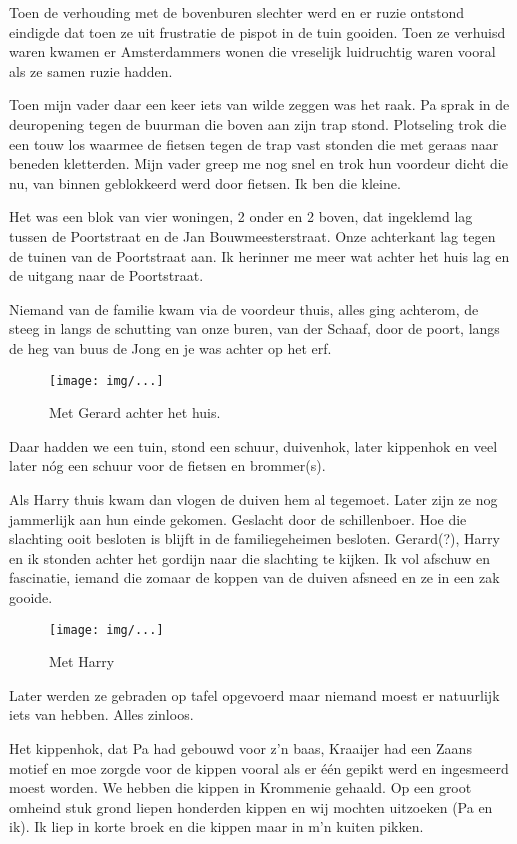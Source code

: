 \documentclass[10pt,twoside,openright]{memoir}
\begin{document}
Toen de verhouding met de bovenburen slechter werd en er ruzie ontstond eindigde dat toen ze uit frustratie de pispot in de tuin gooiden. Toen ze verhuisd waren kwamen er Amsterdammers wonen die vreselijk luidruchtig waren vooral als ze samen ruzie hadden. 

Toen mijn vader daar een keer iets van wilde zeggen was het raak. Pa sprak in de deuropening tegen de buurman die boven aan zijn trap stond. Plotseling trok die een touw los waarmee de fietsen tegen de trap vast stonden die met geraas naar beneden kletterden. Mijn vader greep me nog snel en trok hun voordeur dicht die nu, van binnen geblokkeerd werd door fietsen. Ik ben die kleine.

Het was een blok van vier woningen, 2 onder en 2 boven, dat ingeklemd lag tussen de Poortstraat en de Jan Bouwmeesterstraat. Onze achterkant lag tegen de tuinen van de Poortstraat aan. Ik herinner me meer wat achter het huis lag en de uitgang naar de Poortstraat. 

Niemand van de familie kwam via de voordeur thuis, alles ging achterom, de steeg in langs de schutting van onze buren, van der Schaaf, door de poort, langs de heg van buus de Jong en je was achter op het erf. 

\begin{figure}[t]
\texttt{[image: img/...]}
\caption{Met Gerard achter het huis.}
\end{figure}

Daar hadden we een tuin, stond een schuur, duivenhok, later kippenhok en veel later nóg een schuur voor de fietsen en brommer(s). 

Als Harry thuis kwam dan vlogen de duiven hem al tegemoet. 
Later zijn ze nog jammerlijk aan hun einde gekomen. Geslacht door de schillenboer. Hoe die slachting ooit besloten is blijft in de familiegeheimen besloten. Gerard(?), Harry en ik stonden achter het gordijn naar die slachting te kijken. Ik vol afschuw en fascinatie, iemand die zomaar de koppen van de duiven afsneed en ze in een zak gooide.

\begin{figure}[t]
\texttt{[image: img/...]}
\caption{Met Harry}
\end{figure}

Later werden ze gebraden op tafel opgevoerd maar niemand moest er natuurlijk iets van hebben. Alles zinloos. 

Het kippenhok, dat Pa had gebouwd voor z’n baas, Kraaijer had een Zaans motief en moe zorgde voor de kippen vooral als er één gepikt werd en ingesmeerd moest worden. We hebben die kippen in Krommenie gehaald. Op een groot omheind stuk grond liepen honderden kippen en wij mochten uitzoeken (Pa en ik). Ik liep in korte broek en die kippen maar in m’n kuiten pikken. 
\end{document}
